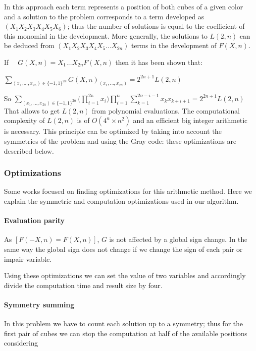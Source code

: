 In this approach each term represents a position of both cubes of a given color and a solution to the problem corresponds to a term developed as $(X_1X_2X_3X_4X_5X_6)$; thus the number of solutions is equal to the coefficient of this monomial in the development. More generally, the solutions to $L(2,n)$ can be deduced from $(X_1X_2X_3X_4X_5...X_{2n})$ terms in the development of $F(X,n)$.

If \ \ $G(X,n) = X_1 ... X_{2n} F(X,n)$ then it has been shown that: 


$\sum\limits_{(x_1,...,x_{2n}) \in \{-1,1\}^{2n}} G(X,n)_{(x_1,...,x_{2n})} =  2^{2n+1}L(2,n)$

So \hspace*{2cm}
$\sum\limits_{(x_1,...,x_{2n}) \in \{-1,1\}^{2n}} \big( \prod\limits_{i=1}^{2n} x_i \big) \prod\limits_{i=1}^{n} \sum\limits_{k=1}^{2n-i-1} x_kx_{k+i+1} = 2^{2n+1} L(2,n)$
\\

\noindent That allows to get $L(2,n)$ from polynomial evaluations.
The computational complexity of $L(2,n)$ is of $O(4^n\times n^2)$ and an efficient big integer arithmetic is necessary. This principle can be optimized by taking into account the symmetries of the problem and using the Gray code: these optimizations are described below.

\subsubsection{Optimizations}
Some works focused on finding optimizations for this arithmetic method\cite{CReSTIC-1154}. Here we explain the symmetric and computation optimizations used in our algorithm.

\paragraph{Evaluation parity}
As $[F(-X,n) = F(X,n)]$, $G$ is not affected by a global sign change. 
In the same way the global sign does not change if we change the sign of each pair or impair variable.

Using these optimizations we can set the value of two variables and accordingly divide the computation time and result size by four.

\paragraph{Symmetry summing}
In this problem we have to count each solution up to a symmetry; thus for the first pair of cubes we can stop the computation at half of the available positions considering 

